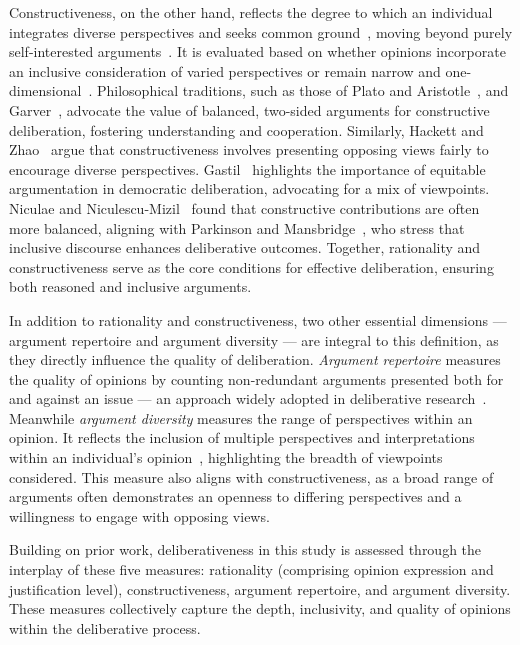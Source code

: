Constructiveness, on the other hand, reflects the degree to which an individual integrates diverse perspectives and seeks common ground~\cite{goddard2023textual, trenel2004measuring}, moving beyond purely self-interested arguments~\cite{kymlicka2002contemporary}. It is evaluated based on whether opinions incorporate an inclusive consideration of varied perspectives or remain narrow and one-dimensional~\cite{trenel2004measuring, black2011self, gastil2007public}. 
Philosophical traditions, such as those of Plato and Aristotle~\cite{walton1999one}, and Garver~\cite{garver2004sake}, advocate the value of balanced, two-sided arguments for constructive deliberation, fostering understanding and cooperation. Similarly, Hackett and Zhao~\cite{hackett1998sustaining} argue that constructiveness involves presenting opposing views fairly to encourage diverse perspectives. Gastil~\cite{gastil2008political} highlights the importance of equitable argumentation in democratic deliberation, advocating for a mix of viewpoints. Niculae and Niculescu-Mizil~\cite{niculae2016conversational} found that constructive contributions are often more balanced, aligning with Parkinson and Mansbridge~\cite{parkinson2012deliberative}, who stress that inclusive discourse enhances deliberative outcomes.
Together, rationality and constructiveness serve as the core conditions for effective deliberation, ensuring both reasoned and inclusive arguments.

In addition to rationality and constructiveness, two other essential dimensions --- argument repertoire and argument diversity --- are integral to this definition, as they directly influence the quality of deliberation. \textit{Argument repertoire} measures the quality of opinions by counting non-redundant arguments presented both for and against an issue --- an approach widely adopted in deliberative research~\cite{menon2020nudge, zhang2021nudge, cappella2002argument, kim2021starrythoughts, yeo2024help}. Meanwhile \textit{argument diversity} measures the range of perspectives within an opinion. It reflects the inclusion of multiple perspectives and interpretations within an individual's opinion~\cite{anderson2016all, gao2023coaicoder, richards2018practical}, highlighting the breadth of viewpoints considered. This measure also aligns with constructiveness, as a broad range of arguments often demonstrates an openness to differing perspectives and a willingness to engage with opposing views. 

Building on prior work, deliberativeness in this study is assessed through the interplay of these five measures: rationality (comprising opinion expression and justification level), constructiveness, argument repertoire, and argument diversity. These measures collectively capture the depth, inclusivity, and quality of opinions within the deliberative process.

